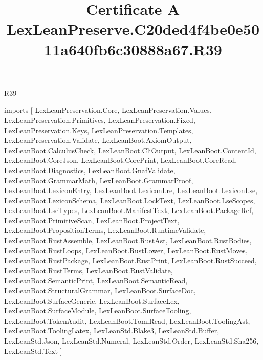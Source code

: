 \begin{lexlean}{R39}
\title{Certificate A LexLeanPreserve.C20ded4f4be0e5011a640fb6c30888a67.R39}
\begin{coremodule}
imports [
  LexLeanPreservation.Core,
  LexLeanPreservation.Values,
  LexLeanPreservation.Primitives,
  LexLeanPreservation.Fixed,
  LexLeanPreservation.Keys,
  LexLeanPreservation.Templates,
  LexLeanPreservation.Validate,
  LexLeanBoot.AxiomOutput,
  LexLeanBoot.CalculusCheck,
  LexLeanBoot.CliOutput,
  LexLeanBoot.ContentId,
  LexLeanBoot.CoreJson,
  LexLeanBoot.CorePrint,
  LexLeanBoot.CoreRead,
  LexLeanBoot.Diagnostics,
  LexLeanBoot.GnafValidate,
  LexLeanBoot.GrammarMath,
  LexLeanBoot.GrammarProof,
  LexLeanBoot.LexiconEntry,
  LexLeanBoot.LexiconLre,
  LexLeanBoot.LexiconLse,
  LexLeanBoot.LexiconSchema,
  LexLeanBoot.LockText,
  LexLeanBoot.LseScopes,
  LexLeanBoot.LseTypes,
  LexLeanBoot.ManifestText,
  LexLeanBoot.PackageRef,
  LexLeanBoot.PrimitiveScan,
  LexLeanBoot.ProjectText,
  LexLeanBoot.PropositionTerms,
  LexLeanBoot.RuntimeValidate,
  LexLeanBoot.RustAssemble,
  LexLeanBoot.RustAst,
  LexLeanBoot.RustBodies,
  LexLeanBoot.RustLoops,
  LexLeanBoot.RustLower,
  LexLeanBoot.RustMoves,
  LexLeanBoot.RustPackage,
  LexLeanBoot.RustPrint,
  LexLeanBoot.RustSucceed,
  LexLeanBoot.RustTerms,
  LexLeanBoot.RustValidate,
  LexLeanBoot.SemanticPrint,
  LexLeanBoot.SemanticRead,
  LexLeanBoot.StructuralGrammar,
  LexLeanBoot.SurfaceDoc,
  LexLeanBoot.SurfaceGeneric,
  LexLeanBoot.SurfaceLex,
  LexLeanBoot.SurfaceModule,
  LexLeanBoot.SurfaceTooling,
  LexLeanBoot.TokenAudit,
  LexLeanBoot.TomlRead,
  LexLeanBoot.ToolingAst,
  LexLeanBoot.ToolingLatex,
  LexLeanStd.Blake3,
  LexLeanStd.Buffer,
  LexLeanStd.Json,
  LexLeanStd.Numeral,
  LexLeanStd.Order,
  LexLeanStd.Sha256,
  LexLeanStd.Text
]


\end{coremodule}
\end{lexlean}
